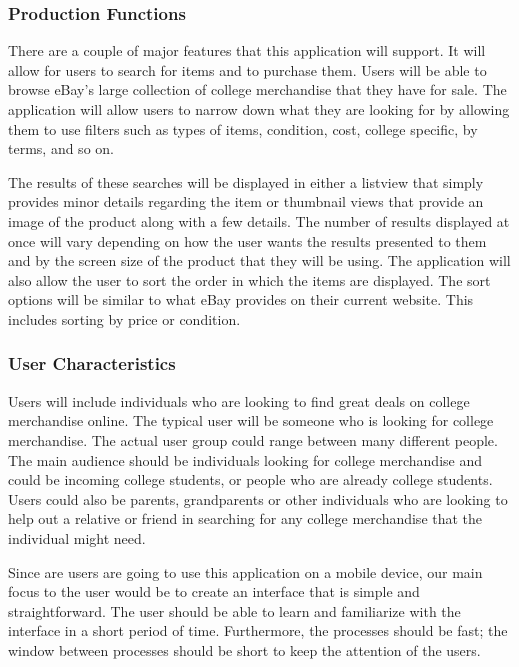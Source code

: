 \documentclass[journal,compsoc, 10pt, draftclsnofoot, onecolumn]{IEEEtran}
\begin{document}
\subsubsection{Production Functions}

There are a couple of major features that this application will support. It will
 allow for users to search for items and to purchase them. Users will be able 
to browse eBay's large collection of college merchandise that they have for 
sale. The application will allow users to narrow down what they are looking for 
by allowing them to use filters such as types of items, condition, cost, college
 specific, by terms, and so on. \newline

The results of these searches will be displayed in either a listview that simply
 provides minor details regarding the item or thumbnail views that provide an 
image of the product along with a few details. The number of results displayed 
at once will vary depending on how the user wants the results presented to them 
and by the screen size of the product that they will be using. The application 
will also allow the user to sort the order in which the items are displayed. The
 sort options will be similar to what eBay provides on their current website. 
This includes sorting by price or condition.

\subsubsection{User Characteristics}

Users will include individuals who are looking to find great deals on college 
merchandise online. The typical user will be someone who is looking for college 
merchandise. The actual user group could range between many different people. 
The main audience should be individuals looking for college merchandise and 
could be incoming college students, or people who are already college students. 
Users could also be parents, grandparents or other individuals who are looking 
to help out a relative or friend in searching for any college merchandise that 
the individual might need. \newline

Since are users are going to use this application on  a mobile device, 
our main focus to the user would be to create an interface that is simple
 and straightforward. The user should be able to learn and familiarize with the interface
 in a short period of time. Furthermore, the processes should be fast; the 
window between processes should be short to keep the attention of the users.
\end{document}
